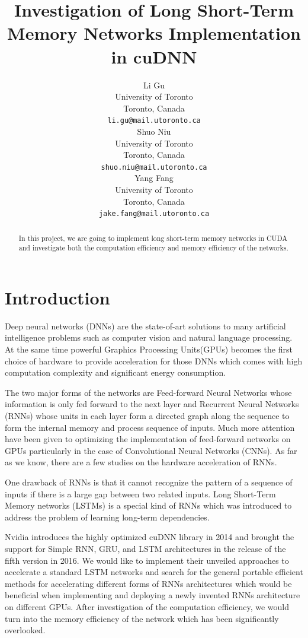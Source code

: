 \documentclass{article}
\title{Investigation of Long Short-Term Memory Networks Implementation in cuDNN}
\author{
  Li Gu \\
  University of Toronto \\
  Toronto, Canada \\
  \texttt{li.gu@mail.utoronto.ca} \\
  \And
  Shuo Niu \\
  University of Toronto \\
  Toronto, Canada \\
  \texttt{shuo.niu@mail.utoronto.ca} \\
  \And
  Yang Fang \\
  University of Toronto \\
  Toronto, Canada \\
  \texttt{jake.fang@mail.utoronto.ca} \\
}
\begin{document}

\maketitle
\begin{abstract}
  In this project, we are going to implement long short-term memory networks in CUDA 
  and investigate both the computation efficiency and memory efficiency of the networks.
\end{abstract}

\section{Introduction}

Deep neural networks (DNNs) are the state-of-art solutions to many artificial intelligence problems such as computer vision and natural language processing. At the same time powerful Graphics Processing Units(GPUs) becomes the first choice of hardware to provide acceleration for those DNNs which comes with high computation complexity and significant energy consumption.

The two major forms of the networks are Feed-forward Neural Networks whose information is only fed forward to the next layer and Recurrent Neural Networks (RNNs) whose units in each layer form a directed graph along the sequence to form the internal memory and process sequence of inputs. Much more attention have been given to optimizing the implementation of feed-forward networks on GPUs particularly in the case of Convolutional Neural Networks (CNNs)\cite{lavin2016fast, vasilache2014fast, li2016optimizing}. As far as we know, there are a few studies on the hardware acceleration of RNNs\cite{appleyard2016optimizing}.

One drawback of RNNs is that it cannot recognize the pattern of a sequence of inputs if there is a large gap between two related inputs. Long Short-Term Memory networks (LSTMs)\cite{hochreiter1997long} is a special kind of RNNs which was introduced to address the problem of learning long-term dependencies.

Nvidia introduces the highly optimized cuDNN library\cite{chetlur2014cudnn} in 2014 and brought the support for Simple RNN, GRU, and LSTM architectures in the release of the fifth version in 2016. We would like to implement their unveiled approaches to accelerate a standard LSTM networks and search for the general portable efficient methods for accelerating different forms of RNNs architectures which would be beneficial when implementing and deploying a newly invented RNNs architecture on different GPUs. After investigation of the computation efficiency, we would turn into the memory efficiency of the network which has been significantly overlooked.
\end{document}

